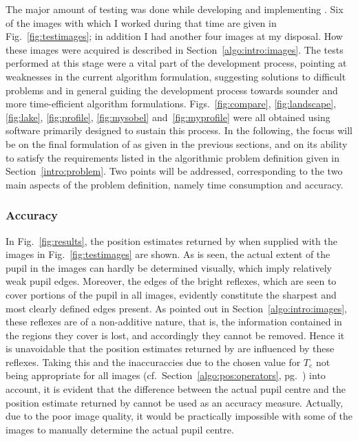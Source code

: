 The major amount of testing was done while developing and implementing
{\octopus}.  Six of the images with which I worked during that time
are given in Fig.~\ref{fig:testimages}; in addition I had another four
images at my disposal.  How these images were acquired is described in
Section~\ref{algo:intro:images}.  The tests performed at this stage
were a vital part of the development process, pointing at weaknesses
in the current algorithm formulation, suggesting solutions to
difficult problems and in general guiding the development process
towards sounder and more time-efficient algorithm formulations.
Figs.~\ref{fig:compare}, \ref{fig:landscape}, \ref{fig:lake},
\ref{fig:profile}, \ref{fig:mysobel} and~\ref{fig:myprofile} were all
obtained using software primarily designed to sustain this process.
In the following, the focus will be on the final formulation of
{\octopus} as given in the previous sections, and on its ability to
satisfy the requirements listed in the algorithmic problem definition
given in Section~\ref{intro:problem}.  Two points will be addressed,
corresponding to the two main aspects of the problem definition,
namely time consumption and accuracy.

\subsubsection{Accuracy}

In Fig.~\ref{fig:results}, the position estimates returned by
{\octopus} when supplied with the images in Fig.~\ref{fig:testimages}
are shown.  As is seen, the actual extent of the pupil in the images
can hardly be determined visually, which imply relatively weak pupil
edges.  Moreover, the edges of the bright reflexes, which are seen to
cover portions of the pupil in all images, evidently constitute the
sharpest and most clearly defined edges present.  As pointed out in
Section~\ref{algo:intro:images}, these reflexes are of a non-additive
nature, that is, the information contained in the regions they cover
is lost, and accordingly they cannot be removed.  Hence it is
unavoidable that the position estimates returned by {\octopus} are
influenced by these reflexes.  Taking this and the inaccuraccies due
to the chosen value for $T_{e}$ not being appropriate for all images
(cf.\ Section~\ref{algo:pos:operators}, pg.~\pageref{pg:TEproblems})
into account, it is evident that the difference between the actual
pupil centre and the position estimate returned by {\octopus} cannot
be used as an accuracy measure.  Actually, due to the poor image
quality, it would be practically impossible with some of the images to
manually determine the actual pupil centre.

